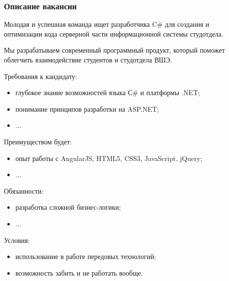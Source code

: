 \documentclass[xetex,mathserif,serif]{beamer}
\begin{document}
	\begin{frame}
		\frametitle{Описание вакансии}
		\begin{scriptsize}
			Молодая и успешная команда ищет разработчика C\# для создания и оптимизации кода серверной части информационной системы студотдела.

			Мы разрабатываем современный программный продукт, который поможет облегчить взаимодействие студентов и студотдела ВШЭ.

			Требования к кандидату:
			\begin{itemize}
				\item глубокое знание возможностей языка С\# и платформы .NET;
				\item понимание принципов разработки на ASP.NET;
				\item ...
			\end{itemize}

			Преимуществом будет:
			\begin{itemize}
				\item опыт работы с AngularJS, HTML5, CSS3, JavaScript, jQuery;
				\item ...
			\end{itemize}

			Обязанности:
			\begin{itemize}
				\item разработка сложной бизнес-логики;
				\item ...
			\end{itemize}

			Условия:
			\begin{itemize}
				\item использование в работе передовых технологий;
				\item возможность забить и не работать вообще.
			\end{itemize}
		\end{scriptsize}
	\end{frame}
\end{document}

